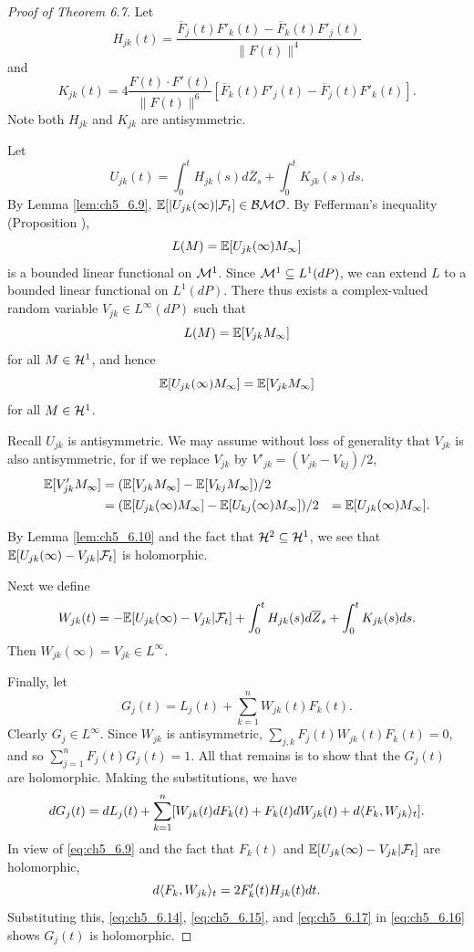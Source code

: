 \begin{proof}[Proof of Theorem 6.7]
Let
\begin{equation}\label{eq:ch5_6.14}
    H_{jk}(t) = \frac{\overline{F}_j(t)F'_k(t) - \overline{F}_k(t)F'_j(t)}{\|F(t)\|^4}
\end{equation}
and
\begin{equation}\label{eq:ch5_6.15}
    K_{jk}(t) = 4\frac{F(t) \cdot F'(t)}{\|F(t)\|^6}[\overline{F}_k(t)F'_j(t) - \overline{F}_j(t)F'_k(t)].
\end{equation}
Note both $H_{jk}$ and $K_{jk}$ are antisymmetric.

Let
\[
    U_{jk}(t) = \int_0^t H_{jk}(s)d\overline{Z}_s + \int_0^t K_{jk}(s)ds.
\]
By Lemma \ref{lem:ch5_6.9}, $\mathbb{E}[|U_{jk}(\infty)| \mathcal{F}_t] \in \mathcal{BMO}$. By Fefferman's inequality (Proposition ),
\[
    L(M) = \mathbb{E}[U_{jk}(\infty)M_\infty]
\]
is a bounded linear functional on $\mathcal{M}^1$. Since $\mathcal{M}^1 \subseteq L^1(dP)$, we can extend $L$ to a bounded linear functional on $L^1(dP)$. There thus exists a complex-valued random variable $V_{jk} \in L^\infty(dP)$ such that
\[
    L(M) = \mathbb{E}[V_{jk}M_\infty]
\]
for all $M \in \mathcal{H}^1$, and hence
\[
    \mathbb{E}[U_{jk}(\infty)M_\infty] = \mathbb{E}[V_{jk}M_\infty]
\]
for all $M \in \mathcal{H}^1$.

\mpagebreak

Recall $U_{jk}$ is antisymmetric. We may assume without loss of generality that $V_{jk}$ is also antisymmetric, for if we replace $V_{jk}$ by $V'_{jk} = (V_{jk} - V_{kj})/2$,
\begin{align*}
    \mathbb{E}[V'_{jk}M_\infty] &= (\mathbb{E}[V_{jk}M_\infty] - \mathbb{E}[V_{kj}M_\infty])/2 \\
    &= (\mathbb{E}[U_{jk}(\infty)M_\infty] - \mathbb{E}[U_{kj}(\infty)M_\infty])/2
    &= \mathbb{E}[U_{jk}(\infty)M_\infty].
\end{align*}

By Lemma \ref{lem:ch5_6.10} and the fact that $\mathcal{H}^2 \subseteq \mathcal{H}^1$, we see that $\mathbb{E}[U_{jk}(\infty) - V_{jk}| \mathcal{F}_t]$ is holomorphic.

Next we define
\begin{equation}\label{eq:ch5_6.16}
    W_{jk}(t) = -\mathbb{E}[U_{jk}(\infty) - V_{jk}| \mathcal{F}_t] + \int_0^t H_{jk}(s)d\overline{Z}_s + \int_0^t K_{jk}(s)ds.
\end{equation}
Then $W_{jk}(\infty) = V_{jk} \in L^\infty$.

Finally, let
\[
    G_j(t) = L_j(t) + \sum_{k=1}^n W_{jk}(t)F_k(t).
\]
Clearly $G_j \in L^\infty$. Since $W_{jk}$ is antisymmetric, $\sum_{j,k} F_j(t)W_{jk}(t)F_k(t) = 0$, and so $\sum_{j=1}^n F_j(t)G_j(t) = 1$. All that remains is to show that the $G_j(t)$ are holomorphic. Making the substitutions, we have
\begin{equation}\label{eq:ch5_6.17}
    dG_j(t) = dL_j(t) + \sum_{k=1}^n[W_{jk}(t)dF_k(t) + F_k(t)dW_{jk}(t) + d\langle F_k,W_{jk} \rangle_t].
\end{equation}
In view of \eqref{eq:ch5_6.9} and the fact that $F_k(t)$ and $\mathbb{E}[U_{jk}(\infty) - V_{jk}|\mathcal{F}_t]$ are holomorphic,
\[
    d\langle F_k,W_{jk} \rangle_t = 2F'_k(t)H_{jk}(t) dt.
\]
Substituting this, \eqref{eq:ch5_6.14}, \eqref{eq:ch5_6.15}, and \eqref{eq:ch5_6.17} in \eqref{eq:ch5_6.16} shows $G_j(t)$ is holomorphic.
\end{proof}

